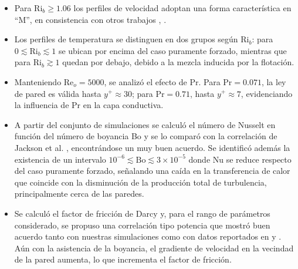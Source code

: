\begin{itemize}

\item Para $\text{Ri}_b \geq 1\text{.}06$ los perfiles de velocidad adoptan una forma característica en ``M'', en consistencia con otros trabajos \cite{you2003direct}, \cite{zhou2024direct}.

\item Los perfiles de temperatura se distinguen en dos grupos según $\text{Ri}_b$: para $0 \lesssim \text{Ri}_b \lesssim 1$ se ubican por encima del caso puramente forzado, mientras que para $\text{Ri}_b \gtrsim 1$ quedan por debajo, debido a la mezcla inducida por la flotación.

\item Manteniendo $\text{Re}_o=5000$, se analizó el efecto de $\text{Pr}$. Para $\text{Pr}=0\text{.}071$, la ley de pared \cite{kawamura1998dns} es válida hasta $y^+ \approx 30$; para $\text{Pr}=0\text{.}71$, hasta $y^+ \approx 7$, evidenciando la influencia de $\text{Pr}$ en la capa conductiva.

\item A partir del conjunto de simulaciones se calculó el número de Nusselt en función del número de boyancia Bo y se lo comparó con la correlación de Jackson et al. \cite{jackson1989studies}, encontrándose un muy buen acuerdo. Se identificó además la existencia de un intervalo $10^{-6} \lesssim \text{Bo} \lesssim 3 \times 10^{-5}$ donde Nu se reduce respecto del caso puramente forzado, señalando una caída en la transferencia de calor que coincide con la disminución de la producción total de turbulencia, principalmente cerca de las paredes.

\item Se calculó el factor de fricción de Darcy y, para el rango de parámetros considerado, se propuso una correlación tipo potencia que mostró buen acuerdo tanto con nuestras simulaciones como con datos reportados en \cite{you2003direct} y \cite{parlatan1996buoyancy}. Aún con la asistencia de la boyancia, el gradiente de velocidad en la vecindad de la pared aumenta, lo que incrementa el factor de fricción.%

\end{itemize}


